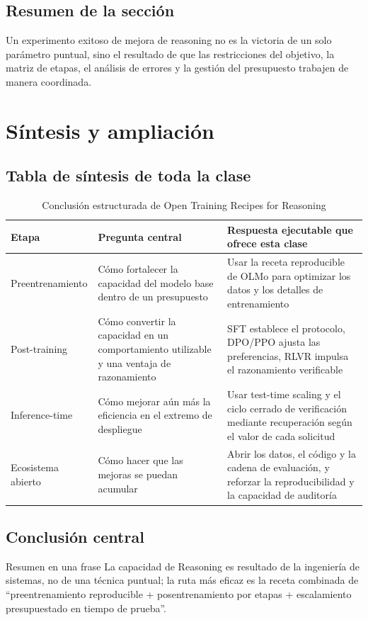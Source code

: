 \documentclass[a4paper]{article}
\begin{document}
\subsection{Resumen de la sección}
Un experimento exitoso de mejora de reasoning no es la victoria de un solo parámetro puntual, sino el resultado de que las restricciones del objetivo, la matriz de etapas, el análisis de errores y la gestión del presupuesto trabajen de manera coordinada.

\section{Síntesis y ampliación}

\subsection{Tabla de síntesis de toda la clase}
\begin{table}[H]
\centering
\renewcommand{\arraystretch}{1.2}
\begin{tabular}{p{2.7cm}p{3.9cm}p{4.2cm}}
\toprule
\textbf{Etapa} & \textbf{Pregunta central} & \textbf{Respuesta ejecutable que ofrece esta clase} \\
\midrule
Preentrenamiento & Cómo fortalecer la capacidad del modelo base dentro de un presupuesto & Usar la receta reproducible de OLMo para optimizar los datos y los detalles de entrenamiento \\
Post-training & Cómo convertir la capacidad en un comportamiento utilizable y una ventaja de razonamiento & SFT establece el protocolo, DPO/PPO ajusta las preferencias, RLVR impulsa el razonamiento verificable \\
Inference-time & Cómo mejorar aún más la eficiencia en el extremo de despliegue & Usar test-time scaling y el ciclo cerrado de verificación mediante recuperación según el valor de cada solicitud \\
Ecosistema abierto & Cómo hacer que las mejoras se puedan acumular & Abrir los datos, el código y la cadena de evaluación, y reforzar la reproducibilidad y la capacidad de auditoría \\
\bottomrule
\end{tabular}
\caption{Conclusión estructurada de Open Training Recipes for Reasoning}
\end{table}

\subsection{Conclusión central}
\begin{importantbox}{Resumen en una frase}
La capacidad de Reasoning es resultado de la ingeniería de sistemas, no de una técnica puntual; la ruta más eficaz es la receta combinada de ``preentrenamiento reproducible + posentrenamiento por etapas + escalamiento presupuestado en tiempo de prueba''.
\end{importantbox}
\end{document}
